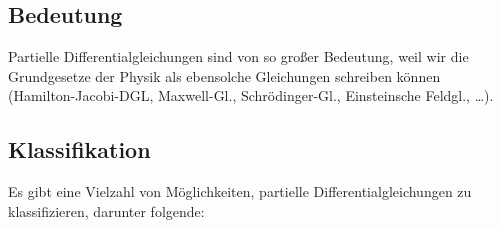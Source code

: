 \documentclass[paper=a4, fontsize=11.0pt, abstractoff, DIV12]{scrartcl}
\begin{document}
\subsection{Bedeutung}

Partielle Differentialgleichungen sind von so großer Bedeutung, weil wir die
Grundgesetze der Physik als ebensolche Gleichungen schreiben können (Hamilton-Jacobi-DGL, Maxwell-Gl., Schrödinger-Gl., Einsteinsche Feldgl., \dots).

\subsection{Klassifikation}

Es gibt eine Vielzahl von Möglichkeiten, partielle Differentialgleichungen zu klassifizieren, darunter folgende:
\end{document}
